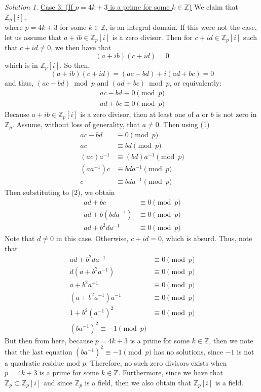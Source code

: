 \documentclass[11pt]{amsart}
\theoremstyle{definition}\newtheorem{question}{Question}
\theoremstyle{definition}\newtheorem{claim}{Claim}
\theoremstyle{remark}\newtheorem*{solution}{Solution}
\newcommand{\Z}{\mathbb{Z}}
\begin{document}
\begin{solution}
    \underline{Case 3: (If $p = 4k + 3$ is a prime for some $k \in \Z$)} We claim that $\Z_p[i]$, \\ where $p = 4k + 3$ for some $k \in \Z$, is an integral domain. If this were not the case, let us assume that $a + ib \in \Z_p[i]$ is a zero divisor. Then for $c + id \in \Z_p[i]$ such that $c + id \neq 0$, we then have that
    \begin{equation*}
        (a + ib)(c + id) = 0
    \end{equation*}
    which is in $\Z_p[i]$. So then,
    \begin{equation*}
        (a + ib)(c + id) = (ac - bd) + i(ad + bc) = 0
    \end{equation*}
    and thus, $(ac - bd) \bmod p$ and $(ad + bc) \bmod p$, or equivalently:
    \begin{align*}
        ac - bd \equiv 0 \pmod p \tag{1} \\
        ad + bc \equiv 0 \pmod p \tag{2}
    \end{align*}
    Because $a + ib \in \Z_p[i]$ is a zero divisor, then at least one of $a$ or $b$ is not zero in $\Z_p$. Assume, without loss of generality, that $a \neq 0$. Then using (1)
    \begin{align*}
        ac - bd &\equiv 0 \pmod p \\
        ac &\equiv bd \pmod p \\
        (ac)a^{-1} &\equiv (bd)a^{-1} \pmod p \\
        (aa^{-1})c &\equiv bda^{-1} \pmod p \\
        c &\equiv bda^{-1} \pmod p
    \end{align*}
    Then substituting to (2), we obtain
    \begin{align*}
        ad + bc &\equiv 0 \pmod p \\
        ad + b(bda^{-1}) &\equiv 0 \pmod p \\
        ad + b^2da^{-1} &\equiv 0 \pmod p
    \end{align*}
    Note that $d \neq 0$ in this case. Otherwise, $c + id = 0$, which is absurd. Thus, note that
    \begin{align*}
        ad + b^2da^{-1} &\equiv 0 \pmod p \\
        d(a + b^2a^{-1}) &\equiv 0 \pmod p \\
        a + b^2a^{-1} &\equiv 0 \pmod p \\
        (a + b^2a^{-1})a^{-1} &\equiv 0 \pmod p \\
        1 + b^2(a^{-1})^2 &\equiv 0 \pmod p \\
        (ba^{-1})^2 \equiv -1 \pmod p
    \end{align*}
    But then from here, because $p = 4k + 3$ is a prime for some $k \in \Z$, then we note that the last equation $(ba^{-1})^2 \equiv -1 \pmod p$ has no solutions, since $-1$ is not a quadratic residue mod $p$. Therefore, no such zero divisors exists when $p = 4k + 3$ is a prime for some $k \in \Z$. Furthermore, since we have that $\Z_p \subset \Z_p[i]$ and since $\Z_p$ is a field, then we also obtain that $\Z_p[i]$ is a field.
\end{solution}
\end{document}
